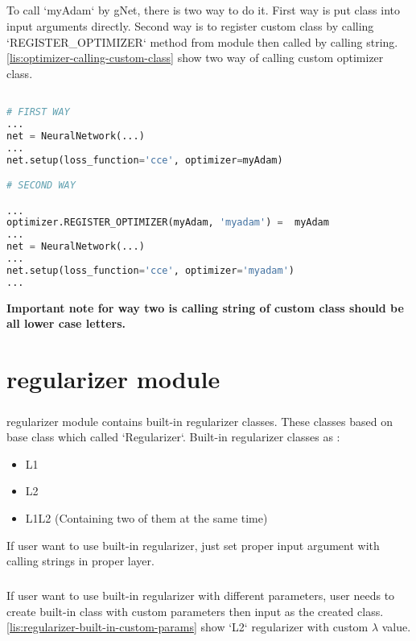 \documentclass[12pt]{report}
\begin{document}
\paragraph{}
To call `myAdam` by gNet, there is two way to do it. First way is put class into input arguments directly. Second way is to register custom class by calling `REGISTER\_OPTIMIZER` method from module then called by calling string. \ref{lis:optimizer-calling-custom-class} show two way of calling custom optimizer class.

\begin{lstlisting}[language=Python, numbers=none, caption={Calling custom optimizer class.}, label={lis:optimizer-calling-custom-class}]

# FIRST WAY
...
net = NeuralNetwork(...)
...
net.setup(loss_function='cce', optimizer=myAdam)

# SECOND WAY

...
optimizer.REGISTER_OPTIMIZER(myAdam, 'myadam') =  myAdam
...
net = NeuralNetwork(...)
...
net.setup(loss_function='cce', optimizer='myadam')
...

\end{lstlisting}

\textbf{Important note for way two is calling string of custom class should be all lower case letters. }






\chapter{regularizer module}
\label{ch:regularizer}

\paragraph{}
regularizer module contains built-in regularizer classes. These classes based on base class which called `Regularizer`. Built-in regularizer classes as : 

\begin{itemize}
	\item L1
	\item L2
	\item L1L2 (Containing two of them at the same time)
\end{itemize}

If user want to use built-in regularizer, just set proper input argument with calling strings in proper layer. 

\paragraph{}
If user want to use built-in regularizer with different parameters, user needs to create built-in class with custom parameters then input as the created class. \ref{lis:regularizer-built-in-custom-params} show `L2` regularizer with custom $\lambda$ value.
\end{document}
